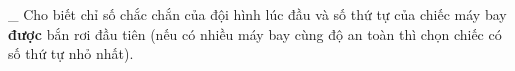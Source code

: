 \_ Cho biết   chỉ số chắc chắn   của đội hình lúc đầu và số thứ tự của chiếc máy bay   \textbf{    được   }bắn rơi đầu tiên   (nếu có nhiều máy bay cùng độ an toàn thì chọn chiếc có số thứ tự nhỏ nhất).